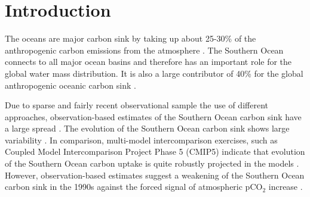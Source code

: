 \documentclass[12pt]{article}
\begin{document}

\section{Introduction}

The oceans are major carbon sink by taking up about 25-30\% of the anthropogenic carbon emissions from the atmosphere \cite{Quere2016}.  
The Southern Ocean connects to all major ocean basins and therefore has an important role for the global water mass distribution. It is also a large contributor of 40\% for the global anthropogenic oceanic carbon sink \cite{Sabine2004}.

Due to sparse and fairly recent observational sample the use of different approaches, observation-based estimates of the Southern Ocean carbon sink have a large spread \cite{Roedenbeck2013,landschuetzer2016}. The evolution of the Southern Ocean carbon sink shows large variability \cite{landschuetzer2016}. In comparison, multi-model intercomparison exercises, such as Coupled Model Intercomparison Project Phase 5 (CMIP5) indicate that evolution of the Southern Ocean carbon uptake is quite robustly projected in the models \cite{ilyinaletter2016}. However, observation-based estimates suggest a weakening of the Southern Ocean carbon sink in the 1990s against the forced signal of atmospheric pCO$_2$ increase \cite{landschuetzer2016}. 
\end{document}
